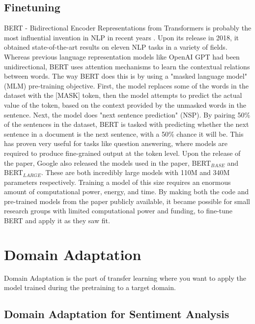 \documentclass{report}
\begin{document}
\subsection{Finetuning}
BERT - Bidirectional Encoder Representations from Transformers is probably the most influential invention in NLP in recent years \cite{DBLP:journals/corr/abs-1810-04805}. Upon its release in 2018, it obtained state-of-the-art results on eleven NLP tasks in a variety of fields. Whereas previous language representation models like OpenAI GPT had been unidirectional, BERT uses attention mechanisms to learn the contextual relations between words. The way BERT does this is by using a "masked language model" (MLM) pre-training objective. First, the model replaces some of the words in the dataset with the [MASK] token, then the model attempts to predict the actual value of the token, based on the context provided by the unmasked words in the sentence. Next, the model does "next sentence prediction" (NSP). By pairing 50\% of the sentences in the dataset, BERT is tasked with predicting whether the next sentence in a document is the next sentence, with a 50\% chance it will be. This has proven very useful for tasks like question answering, where models are required to produce fine-grained output at the token level. Upon the release of the paper, Google also released the models used in the paper, BERT$_{BASE}$ and BERT$_{LARGE}$. These are both incredibly large models with 110M and 340M parameters respectively. Training a model of this size requires an enormous amount of computational power, energy, and time. By making both the code and pre-trained models from the paper publicly available, it became possible for small research groups with limited computational power and funding, to fine-tune BERT and apply it as they saw fit.


\section{Domain Adaptation}
Domain Adaptation is the part of transfer learning where you want to apply the model trained during the pretraining to a target domain.
\subsection{Domain Adaptation for Sentiment Analysis}



\newpage


\end{document}

